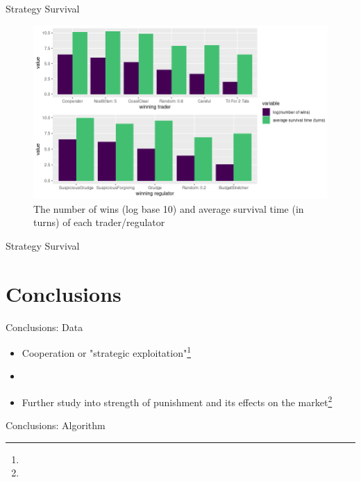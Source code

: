 \documentclass{beamer}
\begin{document}
\begin{frame}{Strategy Survival}
\begin{figure}[!h]
    \includegraphics[width=\textwidth]{barplot.png}
    \caption{The number of wins (log base 10) and average survival time (in turns) of each trader/regulator}
    \label{fig:f2}
\end{figure}

\end{frame}

\begin{frame}{Strategy Survival}
    
\end{frame}


\section{Conclusions}
\begin{frame}{Conclusions: Data}
\begin{itemize}
    \item Cooperation or "strategic exploitation"\footnote{}
    \item 
    \item Further study into strength of punishment and its effects on the market\footnote{}
\end{itemize}
\end{frame}

\begin{frame}{Conclusions: Algorithm}

\end{frame}
\end{document}
